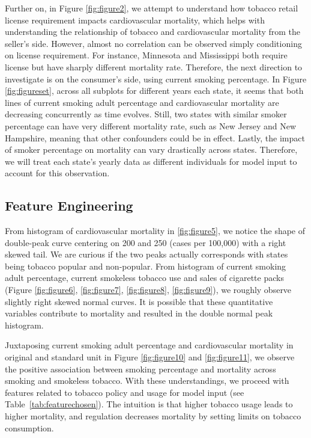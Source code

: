 \documentclass{article}
\begin{document}
Further on, in Figure \ref{fig:figure2}, we attempt to understand how tobacco retail license requirement impacts cardiovascular mortality, which helps with understanding the relationship of tobacco and cardiovascular mortality from the seller's side. However, almost no correlation can be observed simply conditioning on license requirement. For instance, Minnesota and Mississippi both require license but have sharply different mortality rate. Therefore, the next direction to investigate is on the consumer's side, using current smoking percentage. In Figure \ref{fig:figureset}, across all subplots for different years each state, it seems that both lines of current smoking adult percentage and cardiovascular mortality are decreasing concurrently as time evolves. Still, two states with similar smoker percentage can have very different mortality rate, such as New Jersey and New Hampshire, meaning that other confounders could be in effect. Lastly, the impact of smoker percentage on mortality can vary drastically across states. Therefore, we will treat each state's yearly data as different individuals for model input to account for this observation. 

\subsection{Feature Engineering}
From histogram of cardiovascular mortality in \ref{fig:figure5}, we notice the shape of double-peak curve centering on 200 and 250 (cases per 100,000) with a right skewed tail. We are curious if the two peaks actually corresponds with  states being tobacco popular and non-popular. From histogram of current smoking adult percentage, current smokeless tobacco use and sales of cigarette packs (Figure \ref{fig:figure6}, \ref{fig:figure7}, \ref{fig:figure8}, \ref{fig:figure9}), we roughly observe slightly right skewed normal curves. It is possible that these quantitative variables contribute to mortality and resulted in the double normal peak histogram. 

Juxtaposing current smoking adult percentage and cardiovascular mortality in original and standard unit in Figure \ref{fig:figure10} and \ref{fig:figure11}, we observe the positive association between smoking percentage and mortality across smoking and smokeless tobacco. With these  understandings, we proceed with features related to tobacco policy and usage for model input (see Table~\ref{tab:featurechosen}). The intuition is that higher tobacco usage leads to higher mortality, and regulation decreases mortality by setting limits on tobacco consumption. 
\end{document}
